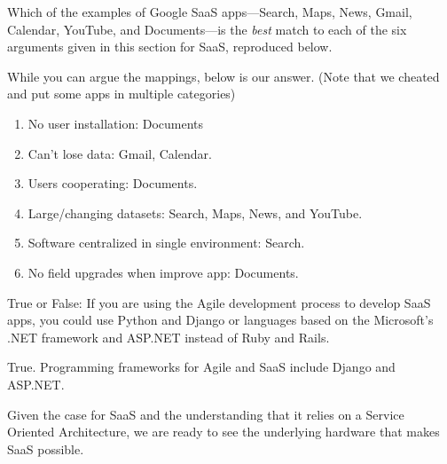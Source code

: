 \begin{checkyourself}
Which of the  examples of Google SaaS apps---Search, Maps, News, Gmail, Calendar, YouTube, and Documents---is the \emph{best} match to each of the six arguments given in this section for SaaS, reproduced below.
  \begin{answer}
While you can argue the mappings, below is our answer. (Note that we cheated and put some apps in multiple categories)
	\begin{enumerate}

	\item No user installation: Documents

	\item Can't lose data: Gmail, Calendar.

	\item Users cooperating: Documents.

	\item Large/changing datasets: Search, Maps, News, and YouTube.

	\item Software centralized in single environment: Search.

	\item No field upgrades when improve app: Documents.

	\end{enumerate}
  \end{answer}
\end{checkyourself}

\begin{checkyourself}
  True or False: If you are using the Agile development process to develop SaaS apps, you could use Python and Django or languages based on the Microsoft's .NET framework and ASP.NET instead of Ruby and Rails.
  \begin{answer}
 True. Programming frameworks for Agile and SaaS include Django and ASP.NET.
  \end{answer}
\end{checkyourself}

Given the case for SaaS and the understanding that it relies on a Service Oriented Architecture, we are ready to see the underlying hardware that makes SaaS possible.